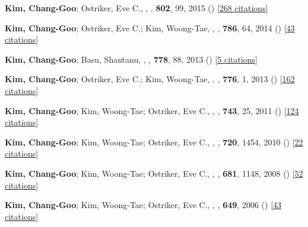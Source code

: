 \item[{8.}]\textbf{Kim, Chang-Goo}; Ostriker, Eve C., , \apj, \textbf{802}, 99, 2015 () [\href{http://adsabs.harvard.edu/abs/2015ApJ...802...99K}{268 citations}]

\item[{7.}]\textbf{Kim, Chang-Goo}; Ostriker, Eve C.; Kim, Woong-Tae, , \apj, \textbf{786}, 64, 2014 () [\href{http://adsabs.harvard.edu/abs/2014ApJ...786...64K}{43 citations}]

\item[{6.}]\textbf{Kim, Chang-Goo}; Basu, Shantanu, , \apj, \textbf{778}, 88, 2013 () [\href{http://adsabs.harvard.edu/abs/2013ApJ...778...88K}{5 citations}]

\item[{5.}]\textbf{Kim, Chang-Goo}; Ostriker, Eve C.; Kim, Woong-Tae, , \apj, \textbf{776}, 1, 2013 () [\href{http://adsabs.harvard.edu/abs/2013ApJ...776....1K}{162 citations}]

\item[{4.}]\textbf{Kim, Chang-Goo}; Kim, Woong-Tae; Ostriker, Eve C., , \apj, \textbf{743}, 25, 2011 () [\href{http://adsabs.harvard.edu/abs/2011ApJ...743...25K}{124 citations}]

\item[{3.}]\textbf{Kim, Chang-Goo}; Kim, Woong-Tae; Ostriker, Eve C., , \apj, \textbf{720}, 1454, 2010 () [\href{http://adsabs.harvard.edu/abs/2010ApJ...720.1454K}{22 citations}]

\item[{2.}]\textbf{Kim, Chang-Goo}; Kim, Woong-Tae; Ostriker, Eve C., , \apj, \textbf{681}, 1148, 2008 () [\href{http://adsabs.harvard.edu/abs/2008ApJ...681.1148K}{52 citations}]

\item[{1.}]\textbf{Kim, Chang-Goo}; Kim, Woong-Tae; Ostriker, Eve C., , \apj, \textbf{649}, 2006 () [\href{http://adsabs.harvard.edu/abs/2006ApJ...649L..13K}{43 citations}]